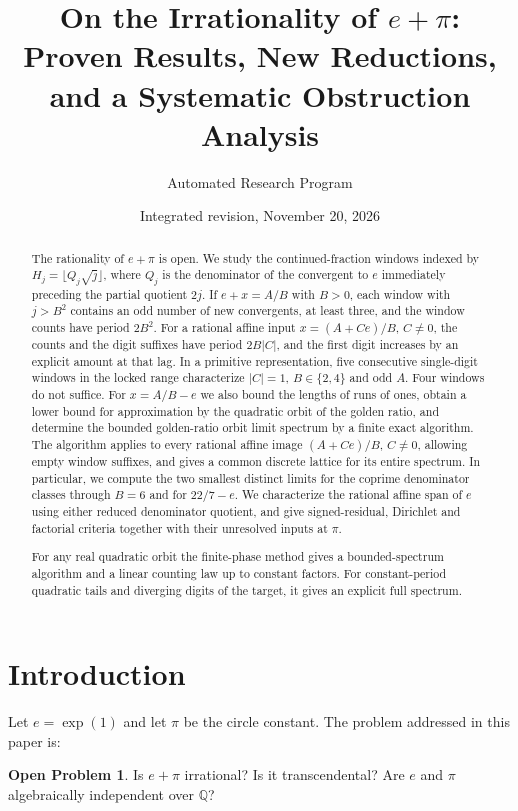 \documentclass[11pt]{amsart}
\title[On the Irrationality of $e+\pi$]{On the Irrationality of $e+\pi$: Proven Results, New Reductions, and a Systematic Obstruction Analysis}
\author{Automated Research Program}
\date{Integrated revision, November 20, 2026}
\theoremstyle{definition}
\newtheorem{problem}[theorem]{Open Problem}
\theoremstyle{remark}
\numberwithin{equation}{section}
\newcommand{\Q}{\mathbb{Q}}
\newcommand{\ee}{e}
\begin{document}
\begin{abstract}
The rationality of $e+\pi$ is open. We study the continued-fraction
windows indexed by $H_j=\lfloor Q_j\sqrt j\rfloor$, where $Q_j$ is the
denominator of the convergent to $e$ immediately preceding the partial
quotient $2j$. If $e+x=A/B$ with $B>0$, each window with $j>B^2$
contains an odd number of new convergents, at least three, and the
window counts have period $2B^2$. For a rational affine input
$x=(A+Ce)/B$, $C\ne0$, the counts and the digit suffixes have period
$2B|C|$, and the first digit increases by an explicit amount at that lag.
In a primitive representation, five consecutive single-digit windows
in the locked range characterize $|C|=1$, $B\in\{2,4\}$ and odd $A$.
Four windows do not suffice. For $x=A/B-e$ we also bound the lengths
of runs of ones, obtain a lower bound for approximation by the
quadratic orbit of the golden ratio, and determine the bounded golden-ratio orbit limit spectrum by a finite
exact algorithm. The algorithm applies to every rational affine image
$(A+Ce)/B$, $C\ne0$, allowing empty window suffixes, and gives a common
discrete lattice for its entire spectrum. In particular, we compute the two smallest distinct
limits for the coprime denominator classes through $B=6$ and for $22/7-e$.
We characterize the rational affine span of $e$ using
either reduced denominator quotient, and give signed-residual,
Dirichlet and factorial criteria together with their unresolved inputs
at $\pi$.

For any real quadratic orbit the finite-phase method gives a
bounded-spectrum algorithm and a linear counting law up to
constant factors. For constant-period quadratic tails and diverging
digits of the target, it gives an explicit full spectrum.
\end{abstract}

\maketitle

\section{Introduction}\label{sec:intro}

Let $\ee=\exp(1)$ and let $\pi$ be the circle constant. The problem addressed in this paper is:

\begin{problem}\label{prob:main}
Is $e+\pi$ irrational? Is it transcendental? Are $e$ and $\pi$ algebraically independent over $\Q$?
\end{problem}
\end{document}
